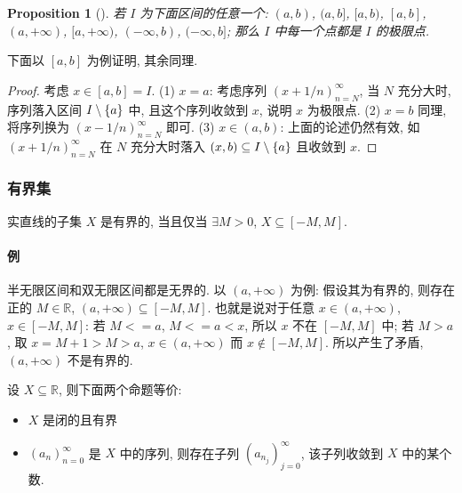 \documentclass[UTF8]{ctexart}
\theoremstyle{mystyle}
\newtheorem{proposition}{Proposition}[section]
\theoremstyle{myremark}
\theoremstyle{plain}
\newcommand{\R}{\mathbb R}
\DeclarePairedDelimiter\set{\{}{\}}
\begin{document}
\begin{proposition}[]
    若 $ I $ 为下面区间的任意一个: $ (a, b) $, $ (a, b] $, $ [a, b) $, $ [a, b] $, $ (a, +\infty) $, $ [a, +\infty) $, $ (-\infty, b) $, $ (-\infty, b] $; 那么 $ I $ 中每一个点都是 $ I $ 的极限点.
\end{proposition}

下面以 $ [a, b] $ 为例证明, 其余同理.

\begin{proof}
    考虑 $ x \in [a, b] = I $. (1) $ x = a $: 考虑序列 $ (x + 1/n)_{n = N}^\infty $, 当 $ N $ 充分大时, 序列落入区间 $ I \setminus \set{a} $ 中, 且这个序列收敛到 $ x $, 说明 $ x $ 为极限点. (2) $ x = b $ 同理, 将序列换为 $ (x - 1/n)_{n = N}^\infty $ 即可. (3) $ x \in (a, b) $: 上面的论述仍然有效, 如 $ (x + 1/n)_{n = N}^\infty $ 在 $ N $ 充分大时落入 $ (x, b) \subseteq I \setminus \set{a} $ 且收敛到 $ x $.
\end{proof}


\subsubsection{有界集}
\begin{definition}[\text{有界}]
    实直线的子集 $ X $ 是有界的, 当且仅当 $ \exists M > 0 $, $ X \subseteq [-M, M] $.
\end{definition}

\paragraph{例}
半无限区间和双无限区间都是无界的. 以 $ (a, +\infty) $ 为例: 假设其为有界的, 则存在正的 $ M \in \R $, $ (a, +\infty) \subseteq [-M, M] $. 也就是说对于任意 $ x \in (a, +\infty) $, $ x \in [-M, M] $: 若 $ M <= a $, $ M <= a < x $, 所以 $ x $ 不在 $ [-M, M] $ 中; 若 $ M > a $, 取 $ x = M + 1 > M > a $, $ x \in (a, +\infty) $ 而  $ x \notin [-M, M] $. 所以产生了矛盾, $ (a, +\infty) $ 不是有界的.

\begin{theorem}
    设 $ X \subseteq \R $, 则下面两个命题等价:
    \begin{itemize}
        \item $ X $ 是闭的且有界
        \item $ (a_n)_{n = 0}^\infty $ 是 $ X $ 中的序列, 则存在子列 $ (a_{n_j})_{j = 0}^\infty $, 该子列收敛到 $ X $ 中的某个数.
    \end{itemize}
\end{theorem}
\end{document}
